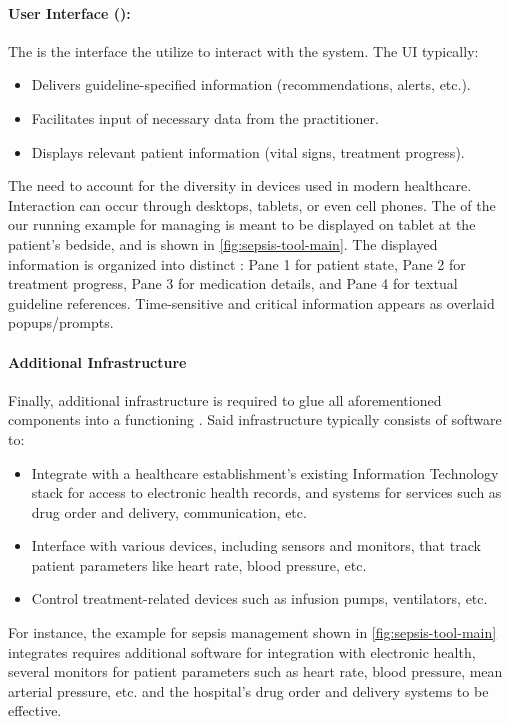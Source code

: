 \paragraph{User Interface (\UI{}):}

The \UI{} is the interface the \HCPs{} utilize to interact with the system.
The UI typically:
\begin{itemize}
  \item Delivers guideline-specified information (recommendations, alerts, etc.).
  \item Facilitates input of necessary data from the practitioner.
  \item Displays relevant patient information (vital signs, treatment progress).
\end{itemize}

The \UIs{} need to account for the diversity in devices used in modern
healthcare. Interaction can occur through desktops, tablets, or even cell
phones. The \UI{} of the our running example \CDSS{} for managing \CDSS{}
is meant to be displayed on tablet at the patient's bedside, and is shown in
\autoref{fig:sepsis-tool-main}.
The displayed information is organized into distinct :
Pane 1 for patient state, Pane 2 for treatment progress,
Pane 3 for medication details, and Pane 4 for textual guideline references.
Time-sensitive and critical information appears as overlaid popups/prompts.

\paragraph{Additional Infrastructure}

Finally, additional infrastructure is required to glue all aforementioned
components into a functioning \CDSS{}. Said infrastructure typically consists
of software to:
\begin{itemize}
  \item Integrate with a healthcare establishment's existing Information Technology
    stack for access to electronic health records, and systems for services such
    as drug order and delivery, \HCP{} communication, etc.
  \item Interface with various devices, including sensors and monitors,
    that track patient parameters like heart rate, blood pressure, etc.
  \item Control treatment-related devices such as infusion pumps, ventilators, etc.
\end{itemize}
For instance, the example \CDSS{} for sepsis management shown in
\autoref{fig:sepsis-tool-main} integrates requires additional software for integration with
electronic health, several monitors for patient parameters
such as heart rate, blood pressure, mean arterial pressure, etc. and the
hospital's drug order and delivery systems to be effective.



